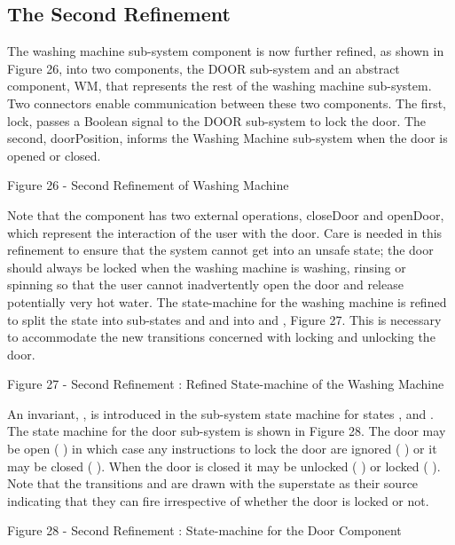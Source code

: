 \subsection{The Second Refinement}
\label{sec:component_diagrams-tutorial_secondRefinement}


The washing machine sub-system component is now further refined, as shown in Figure 26, into two components, the DOOR sub-system and an abstract component, WM, that represents the rest of the washing machine sub-system. Two connectors enable communication between these two components. The first, lock, passes a Boolean signal to the DOOR sub-system to lock the door. The second, doorPosition, informs the Washing Machine sub-system when the door is opened or closed.
 
Figure 26 - Second Refinement of Washing Machine

Note that the   component has two external operations, closeDoor and openDoor, which represent the interaction of the user with the door. Care is needed in this refinement to ensure that the system cannot get into an unsafe state; the door should always be locked when the washing machine is washing, rinsing or spinning so that the user cannot inadvertently open the door and release potentially very hot water.
The state-machine for the washing machine is refined to split the   state into sub-states   and   and   into   and  , Figure 27. This is necessary to accommodate the new transitions concerned with locking and unlocking the door.
 
Figure 27 - Second Refinement : Refined State-machine of the Washing Machine

An invariant,  , is introduced in the sub-system state machine for states  ,   and  .
The state machine for the door sub-system is shown in Figure 28. The door may be open ( ) in which case any instructions to lock the door are ignored ( ) or it may be closed ( ). When the door is closed it may be unlocked ( ) or locked ( ). Note that the transitions   and   are drawn with the superstate   as their source indicating that they can fire irrespective of whether the door is locked or not.
 
Figure 28 - Second Refinement : State-machine for the Door Component

